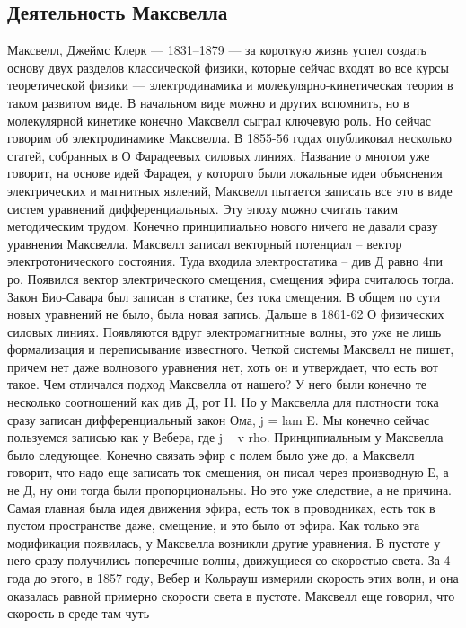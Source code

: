 \documentclass[a4paper, 12pt]{article}
\begin{document}
\subsection{Деятельность Максвелла}

Максвелл, Джеймс Клерк --- 1831--1879 --- за короткую жизнь успел 
создать основу двух разделов классической физики, которые сейчас входят 
во все курсы теоретической физики --- электродинамика 
и молекулярно-кинетическая теория в таком развитом виде. В начальном 
виде можно и других вспомнить, но в молекулярной кинетике конечно 
Максвелл сыграл ключевую роль. Но сейчас говорим об электродинамике 
Максвелла. В 1855-56 годах опубликовал несколько статей, собранных 
в О Фарадеевых силовых линиях. Название о многом уже говорит, на основе 
идей Фарадея, у которого были локальные идеи объяснения электрических 
и магнитных явлений, Максвелл пытается записать все это в виде систем 
уравнений дифференциальных. Эту эпоху можно считать таким методическим 
трудом. Конечно принципиально нового ничего не давали сразу уравнения 
Максвелла. Максвелл записал векторный потенциал -- вектор 
электротонического состояния. Туда входила электростатика -- див Д равно 
4пи ро. Появился вектор электрического смещения, смещения эфира 
считалось тогда. Закон Био-Савара был записан в статике, без тока 
смещения. В общем по сути новых уравнений не было, была новая запись. 
Дальше в 1861-62 О физических силовых линиях. Появляются вдруг 
электромагнитные волны, это уже не лишь формализация и переписывание 
известного. Четкой системы Максвелл не пишет, причем нет даже волнового 
уравнения нет, хоть он и утверждает, что есть вот такое. Чем отличался 
подход Максвелла от нашего? У него были конечно те несколько соотношений 
как див Д, рот Н. Но у Максвелла для плотности тока сразу записан 
дифференциальный закон Ома, j = lam E. Мы конечно сейчас пользуемся 
записью как у Вебера, где j ~ v rho. Принципиальным у Максвелла было 
следующее. Конечно связать эфир с полем было уже до, а Максвелл говорит, 
что надо еще записать ток смещения, он писал через производную Е, а не 
Д, ну они тогда были пропорциональны. Но это уже следствие, а не 
причина. Самая главная была идея движения эфира, есть ток в проводниках, 
есть ток в пустом пространстве даже, смещение, и это было от эфира. Как 
только эта модификация появилась, у Максвелла возникли другие уравнения. 
В пустоте у него сразу получились поперечные волны, движущиеся со 
скоростью света. За 4 года до этого, в 1857 году, Вебер и Кольрауш 
измерили скорость этих  волн, и она оказалась равной примерно скорости 
света в пустоте. Максвелл еще говорил, что скорость в среде там чуть 
\end{document}
